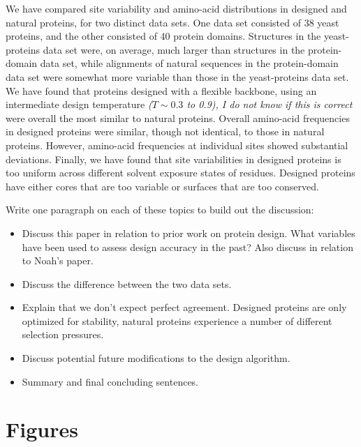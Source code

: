 \documentclass[12pt]{article}
\begin{document}
We have compared site variability and amino-acid distributions in designed and natural proteins, for two distinct data sets. One data set consisted of 38 yeast proteins, and the other consisted of 40 protein domains. Structures in the yeast-proteins data set were, on average, much larger than structures in the protein-domain data set, while alignments of natural sequences in the protein-domain data set were somewhat more variable than those in the yeast-proteins data set. We have found that proteins designed with a flexible backbone, using an intermediate design temperature {\color{red} \emph{($T\sim0.3$ to 0.9), I do not know if this is correct}} were overall the most similar to natural proteins. Overall amino-acid frequencies in designed proteins were similar, though not identical, to those in natural proteins. However, amino-acid frequencies at individual sites showed substantial deviations. Finally, we have found that site variabilities in designed proteins is too uniform across different solvent exposure states of residues. Designed proteins have either cores that are too variable or surfaces that are too conserved.

{
\color{red}Write one paragraph on each of these topics to build out the discussion:
\begin{itemize}
\item Discuss this paper in relation to prior work on protein design. What variables have been used to assess design accuracy in the past? Also discuss in relation to Noah's paper.
\item Discuss the difference between the two data sets.
\item Explain that we don't expect perfect agreement. Designed proteins are only optimized for stability, natural proteins experience a number of different selection pressures.
\item Discuss potential future modifications to the design algorithm.
\item Summary and final concluding sentences.
\end{itemize}
}



\cleardoublepage

\section{Figures}
\end{document}

